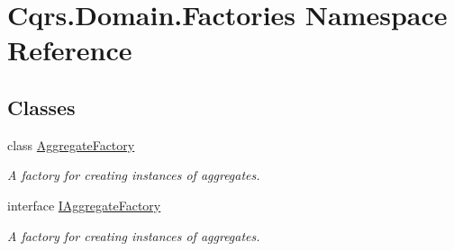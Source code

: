 \hypertarget{namespaceCqrs_1_1Domain_1_1Factories}{}\section{Cqrs.\+Domain.\+Factories Namespace Reference}
\label{namespaceCqrs_1_1Domain_1_1Factories}
\subsection*{Classes}
\begin{DoxyCompactItemize}
\item 
class \hyperlink{classCqrs_1_1Domain_1_1Factories_1_1AggregateFactory}{Aggregate\+Factory}
\begin{DoxyCompactList}\small\item\em A factory for creating instances of aggregates. \end{DoxyCompactList}\item 
interface \hyperlink{interfaceCqrs_1_1Domain_1_1Factories_1_1IAggregateFactory}{I\+Aggregate\+Factory}
\begin{DoxyCompactList}\small\item\em A factory for creating instances of aggregates. \end{DoxyCompactList}\end{DoxyCompactItemize}
